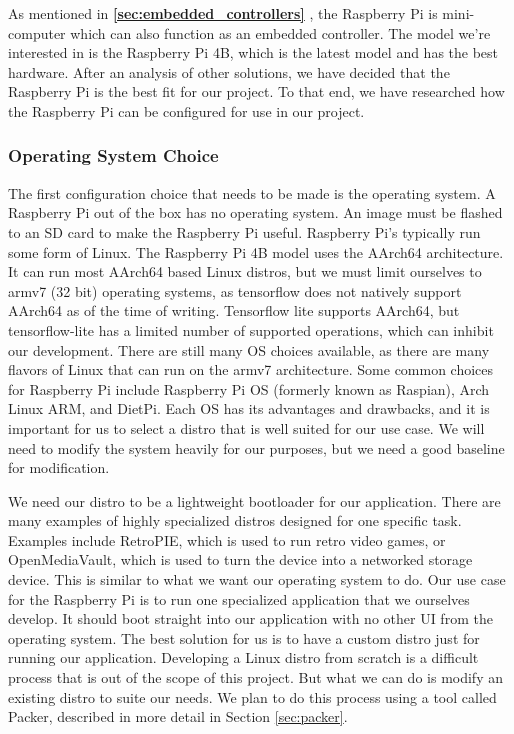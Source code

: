 As mentioned in \textbf{\ref{sec:embedded_controllers} },
the Raspberry Pi is mini-computer which can also function as an embedded controller. The
model we're interested in is the Raspberry Pi 4B, which is the latest model and has the
best hardware. After an analysis of other solutions, we have decided that the
Raspberry Pi is the best fit for our project. To that end, we have researched how the
Raspberry Pi can be configured for use in our project.

\subsubsection{Operating System Choice}

The first configuration choice that needs to be made is the operating system. A Raspberry
Pi out of the box has no operating system. An image must be flashed to an SD card to make
the Raspberry Pi useful. Raspberry Pi's typically run some form of Linux. The Raspberry Pi
4B model uses the AArch64 architecture. It can run most AArch64 based Linux distros, but
we must limit ourselves to armv7 (32 bit) operating systems, as tensorflow does not
natively support AArch64 as of the time of writing. Tensorflow lite supports AArch64, but
tensorflow-lite has a limited number of supported operations, which can inhibit our
development. There are still many OS choices available, as there are many flavors of Linux
that can run on the armv7 architecture. Some common choices for Raspberry Pi include
Raspberry Pi OS (formerly known as Raspian), Arch Linux ARM, and DietPi. Each OS has its
advantages and drawbacks, and it is important for us to select a distro that is well
suited for our use case. We will need to modify the system heavily for our purposes, but
we need a good baseline for modification.

We need our distro to be a lightweight bootloader for our application. There are many
examples of highly specialized distros designed for one specific task. Examples
include RetroPIE, which is used to run retro video games, or OpenMediaVault, which is used
to turn the device into a networked storage device. This is similar to what we want our
operating system to do. Our use case for the Raspberry Pi is to run one specialized
application that we ourselves develop. It should boot straight into our application with
no other UI from the operating system. The best solution for us is to have a custom distro
just for running our application. Developing a Linux distro from scratch is a difficult
process that is out of the scope of this project. But what we can do is modify an existing
distro to suite our needs. We plan to do this process using a tool called Packer,
described in more detail in Section \ref{sec:packer}.

